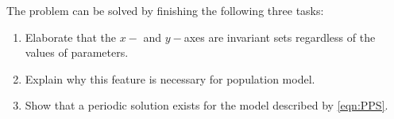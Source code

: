 The problem can be solved by finishing the following three tasks:
\begin{enumerate}
  \item Elaborate that the $x-$ and $y-$axes are invariant sets regardless of the values of parameters.
  \item Explain why this feature is necessary for population model.
  \item Show that a periodic solution exists for the model described by \eqref{eqn:PPS}.
\end{enumerate}